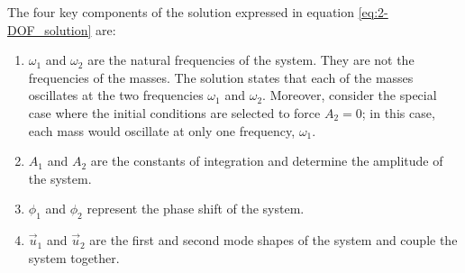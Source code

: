 \documentclass[12pt,letter]{article}
\begin{document}
\noindent The four key components of the solution expressed in equation \ref{eq:2-DOF_solution} are:
\begin{enumerate}
\item $\omega_1$ and $\omega_2$ are the natural frequencies of the system. They are not the frequencies of the masses. The solution states that each of the masses oscillates at the two frequencies $\omega_1$ and $\omega_2$. Moreover, consider the special case where the initial conditions are selected to force $A_2 = 0$; in this case, each mass would oscillate at only one frequency, $\omega_1$.
\item $A_1$ and $A_2$ are the constants of integration and determine the amplitude of the system.
\item $\phi_1$ and $\phi_2$ represent the phase shift of the system.

\item $\vec{u}_1$ and $\vec{u}_2$ are the first and second mode shapes of the system and couple the system together.
\end{enumerate}
\end{document}
